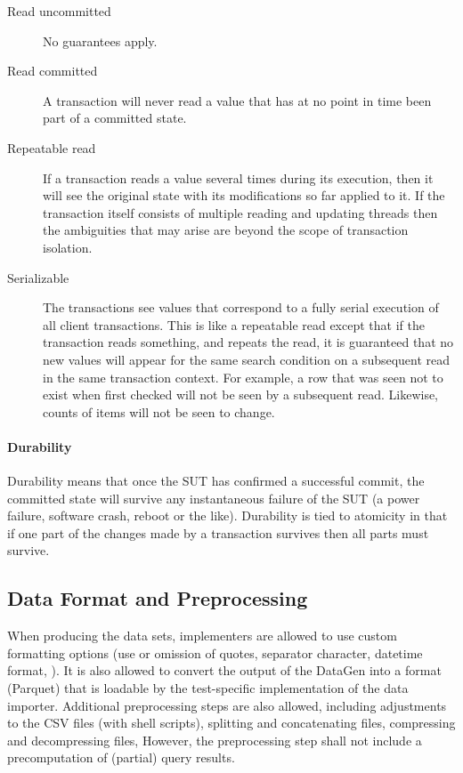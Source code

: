\begin{description}
    \item[Read uncommitted] No guarantees apply.
    \item[Read committed] A transaction will never read a value that has at no point in time been part of a
        committed state.
    \item[Repeatable read] If a transaction reads a value several times during its execution, then it will see
        the original state with its modifications so far applied to it. If the transaction itself consists of
        multiple reading and updating threads then the ambiguities that may arise are beyond the scope of transaction isolation.
    \item[Serializable] The transactions see values that correspond to a fully serial execution of
        all client transactions. This is like a repeatable read except that if the transaction reads something, and
        repeats the read, it is guaranteed that no new values will appear for the same search condition on a
        subsequent read in the same transaction context. For example, a row that was seen not to exist when
        first checked will not be seen by a subsequent read. Likewise, counts of items will not be seen to
        change.
\end{description}

\paragraph{Durability}
Durability means that once the SUT has confirmed a successful commit, the committed state
will survive any instantaneous failure of the SUT (\eg a power failure, software crash, reboot or
the like). Durability is tied to atomicity in that if one part of the changes made by a transaction survives then
all parts must survive. %


\subsection{Data Format and Preprocessing}
\label{sec:auditing-data-format}

When producing the data sets, implementers are allowed to use custom formatting options (\eg use or omission of quotes, separator character, datetime format, \etc).
It is also allowed to convert the output of the DataGen into a format (\eg Parquet) that is loadable by the test-specific implementation of the data importer.
Additional preprocessing steps are also allowed, including adjustments to the CSV files (\eg with shell scripts), splitting and concatenating files, compressing and decompressing files, \etc
However, the preprocessing step shall not include a precomputation of (partial) query results.

